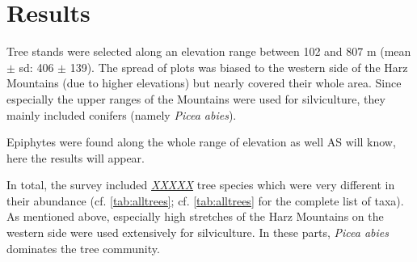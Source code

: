 \documentclass[a4paper]{article}
\newcommand{\imp}[1]{\underline{\textit{#1}}}
\begin{document}
\section{Results}
Tree stands were selected along an elevation range between 102 and 807 m (mean $ \pm $ sd: 406 $ \pm $ 139). The spread of plots was biased to the western side of the Harz Mountains (due to higher elevations) but nearly covered their whole area. Since especially the upper ranges of the Mountains were used for silviculture, they mainly included conifers (namely \textit{Picea abies}).

 
Epiphytes were found along the whole range of elevation as well 
AS \cite{Zotz2009} will know, here the results will appear.

In total, the survey included \imp{XXXXX} tree species which were very different in their abundance (cf. \autoref{tab:alltrees}; cf. \autoref{tab:alltrees} for the complete list of taxa). As mentioned above, especially high stretches of the Harz Mountains on the western side were used extensively for silviculture. In these parts, \textit{Picea abies} dominates the tree community. 
\end{document}
